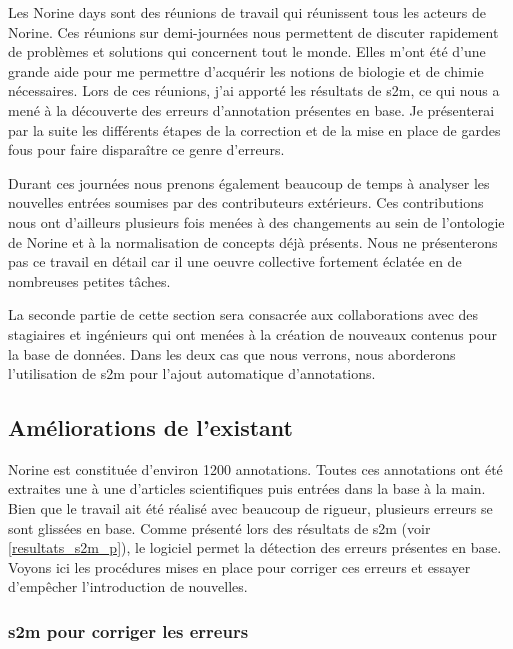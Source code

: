Les Norine days sont des réunions de travail qui réunissent tous les acteurs de Norine.
Ces réunions sur demi-journées nous permettent de discuter rapidement de problèmes et solutions qui concernent tout le monde.
Elles m'ont été d'une grande aide pour me permettre d'acquérir les notions de biologie et de chimie nécessaires.
Lors de ces réunions, j'ai apporté les résultats de s2m, ce qui nous a mené à la découverte des erreurs d'annotation présentes en base.
Je présenterai par la suite les différents étapes de la correction et de la mise en place de gardes fous pour faire disparaître ce genre d'erreurs.

Durant ces journées nous prenons également beaucoup de temps à analyser les nouvelles entrées soumises par des contributeurs extérieurs.
Ces contributions nous ont d'ailleurs plusieurs fois menées à des changements au sein de l'ontologie de Norine et à la normalisation de concepts déjà présents.
Nous ne présenterons pas ce travail en détail car il une oeuvre collective fortement éclatée en de nombreuses petites tâches.

La seconde partie de cette section sera consacrée aux collaborations avec des stagiaires et ingénieurs qui ont menées à la création de nouveaux contenus pour la base de données.
Dans les deux cas que nous verrons, nous aborderons l'utilisation de s2m pour l'ajout automatique d'annotations.


\subsection{Améliorations de l'existant}

Norine est constituée d'environ 1200 annotations.
Toutes ces annotations ont été extraites une à une d'articles scientifiques puis entrées dans la base à la main.
Bien que le travail ait été réalisé avec beaucoup de rigueur, plusieurs erreurs se sont glissées en base.
Comme présenté lors des résultats de s2m (voir \ref{resultats_s2m_p}), le logiciel permet la détection des erreurs présentes en base.
Voyons ici les procédures mises en place pour corriger ces erreurs et essayer d'empêcher l'introduction de nouvelles.


\subsubsection{s2m pour corriger les erreurs}

